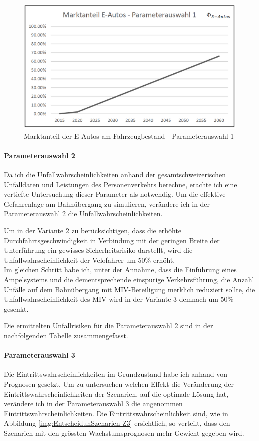 \begin{figure}[h!]
	\centering
	\includegraphics[width=.6\textwidth]{figures/f-04-09-01-Marktanteil-E-Autos-Zustand-1}
	\caption[Marktanteil E-Autos - Parameterauswahl 1]{Marktanteil der E-Autos am Fahrzeugbestand - Parameterauswahl 1}
	\label{img:Marktanteil-Z1}
\end{figure}


\paragraph{Parameterauswahl 2} Da ich die Unfallwahrscheinlichkeiten anhand der gesamtschweizerischen Unfalldaten und Leistungen des Personenverkehrs berechne, erachte ich eine vertiefte Untersuchung dieser Parameter als notwendig. Um die effektive Gefahrenlage am Bahnübergang zu simulieren, verändere ich in der Parameterauswahl 2 die Unfallwahrscheinlichkeiten. 

Um in der Variante 2 zu berücksichtigen, dass die erhöhte Durchfahrtsgeschwindigkeit in Verbindung mit der geringen Breite der Unterführung ein gewisses Sicherheitsrisiko darstellt, wird die Unfallwahrscheinlichkeit der Velofahrer um 50\% erhöht. \\
Im gleichen Schritt habe ich, unter der Annahme, dass die Einführung eines Ampelsystems und die dementsprechende einspurige Verkehrsführung, die Anzahl Unfälle auf dem Bahnübergang mit MIV-Beteiligung merklich reduziert sollte, die Unfallwahrscheinlichkeit des MIV wird in der Variante 3 demnach um 50\% gesenkt. 

Die ermittelten Unfallrisiken für die Parameterauswahl 2 sind in der nachfolgenden Tabelle zusammengefasst. 



\paragraph{Parameterauswahl 3} Die Eintrittswahrscheinlichkeiten im Grundzustand habe ich anhand von Prognosen gesetzt. Um zu untersuchen welchen Effekt die Veränderung der Eintrittswahrscheinlichkeiten der Szenarien, auf die optimale Lösung hat, verändere ich in der Parameterauswahl 3 die angenommen Eintrittswahrscheinlichkeiten. Die Eintrittswahrscheinlichkeit sind, wie in Abbildung \ref{img:EntscheidunSzenarien-Z3} ersichtlich, so verteilt, dass den Szenarien mit den grössten Wachstumsprognosen mehr Gewicht gegeben wird. 

